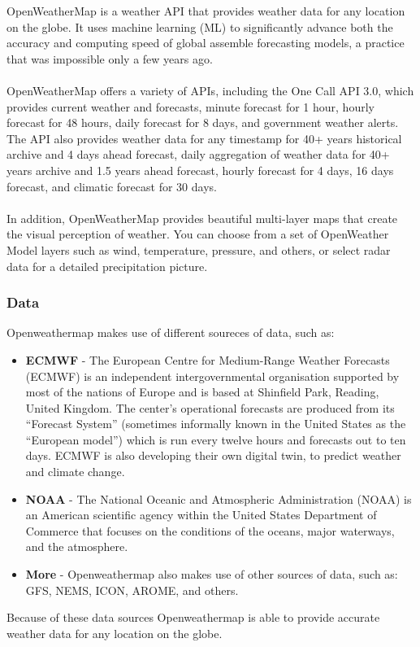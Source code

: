 \documentclass[../paper.tex]{subfiles}
\begin{document}
    OpenWeatherMap is a weather API that provides weather data for any location on the globe.
    It uses machine learning (ML) to significantly advance both the accuracy and computing speed of global assemble forecasting models, a practice that was impossible only a few years ago\cite{b1}.
    \\\\
    OpenWeatherMap offers a variety of APIs, including the One Call API 3.0, which provides current weather and forecasts, minute forecast for 1 hour, hourly forecast for 48 hours, daily forecast for 8 days, and government weather alerts\cite{b1}.
    The API also provides weather data for any timestamp for 40+ years historical archive and 4 days ahead forecast, daily aggregation of weather data for 40+ years archive and 1.5 years ahead forecast, hourly forecast for 4 days, 16 days forecast, and climatic forecast for 30 days\cite{b1}.
    \\\\
    In addition, OpenWeatherMap provides beautiful multi-layer maps that create the visual perception of weather.
    You can choose from a set of OpenWeather Model layers such as wind, temperature, pressure, and others, or select radar data for a detailed precipitation picture\cite{b1}.

    \subsubsection{Data}
    Openweathermap makes use of different soureces of data, such as:
    \begin{itemize}
        \item \textbf{ECMWF} - The European Centre for Medium-Range Weather Forecasts (ECMWF) is an independent intergovernmental organisation supported by most of the nations of Europe and is based at Shinfield Park, Reading, United Kingdom.
         The center's operational forecasts are produced from its ``Forecast System'' (sometimes informally known in the United States as the ``European model'') which is run every twelve hours and forecasts out to ten days\cite{b4}.
         ECMWF is also developing their own digital twin, to predict weather and climate change\cite{b5}.
        \item \textbf{NOAA} - The National Oceanic and Atmospheric Administration (NOAA) is an American scientific agency within the United States Department of Commerce that focuses on the conditions of the oceans, major waterways, and the atmosphere\cite{b6}.
        \item \textbf{More} - Openweathermap also makes use of other sources of data, such as: GFS, NEMS, ICON, AROME, and others\cite{b2}.
    \end{itemize}
    Because of these data sources Openweathermap is able to provide accurate weather data for any location on the globe.
\end{document}
